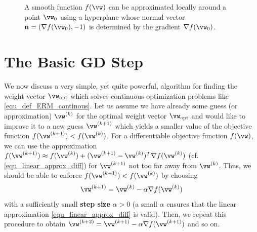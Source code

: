 \documentclass[12pt]{report}
\begin{document}
\begin{figure}[htbp]
\begin{center}
\end{center}
\caption{A smooth function $f(\vw)$ can be approximated locally around a point $\vw_{0}$ using a 
hyperplane whose normal vector $\mathbf{n} = (\nabla f(\vw_{0}),-1)$ is determined by the gradient $\nabla f(\vw_{0})$.}
\label{fig_smooth_function}
\end{figure}



\section{The Basic GD Step}
\label{sec_basic_GD_iteration}

We now discuss a very simple, yet quite powerful, algorithm for finding the weight vector $\vw_{\rm opt}$ which 
solves continuous optimization problems like \eqref{equ_def_ERM_continous}. Let us assume we have already some 
guess (or approximation) $\vw^{(k)}$ for the optimal weight vector $\vw_{\rm opt}$ and would like to improve it to a 
new guess $\vw^{(k+1)}$ which yields a smaller value of the objective function $f(\vw^{(k+1)}) < f(\vw^{(k)})$. 
For a differentiable objective function $f(\vw)$, we can use the approximation 
$f(\vw^{(k+1)})  \approx f(\vw^{(k)}) + (\vw^{(k+1)} - \vw^{(k)})^{T} \nabla f(\vw^{(k)})$ (cf. \eqref{equ_linear_approx_diff}) for $\vw^{(k+1)}$ 
not too far away from $\vw^{(k)}$. %
Thus, we should be able to enforce $f(\vw^{(k+1)}) < f(\vw^{(k)})$ by choosing 
\begin{equation} 
\label{equ_def_GD_step}
\vw^{(k+1)} = \vw^{(k)} - \alpha \nabla f(\vw^{(k)})
\end{equation} 
with a sufficiently small {\bf step size} $\alpha>0$ (a small $\alpha$ ensures that the linear approximation \eqref{equ_linear_approx_diff} is valid). 
Then, we repeat this procedure to obtain $\vw^{(k+2)} = \vw^{(k+1)} - \alpha \nabla f(\vw^{(k+1)})$ and so on. 
\end{document}
